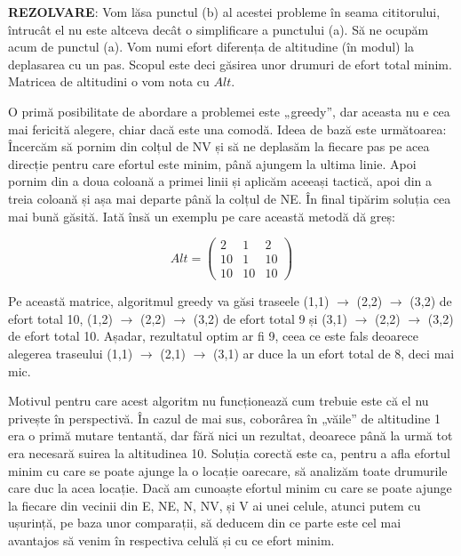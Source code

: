 {\bf REZOLVARE}: Vom lăsa punctul (b) al acestei probleme în seama
cititorului, întrucât el nu este altceva decât o simplificare a punctului
(a). Să ne ocupăm acum de punctul (a). Vom numi efort diferența de altitudine
(în modul) la deplasarea cu un pas. Scopul este deci găsirea unor drumuri de
efort total minim. Matricea de altitudini o vom nota cu $Alt$.

O primă posibilitate de abordare a problemei este „greedy”, dar aceasta nu e
cea mai fericită alegere, chiar dacă este una comodă. Ideea de bază este
următoarea: Încercăm să pornim din colțul de NV și să ne deplasăm la fiecare
pas pe acea direcție pentru care efortul este minim, până ajungem la ultima
linie. Apoi pornim din a doua coloană a primei linii și aplicăm aceeași
tactică, apoi din a treia coloană și așa mai departe până la colțul de NE. În
final tipărim soluția cea mai bună găsită. Iată însă un exemplu pe care
această metodă dă greș:

\begin{equation}
  Alt =
  \begin{pmatrix}
    2 & 1 & 2 \\
    10 & 1 & 10 \\
    10 & 10 & 10
  \end{pmatrix}
\end{equation}

Pe această matrice, algoritmul greedy va găsi traseele (1,1) $\to$ (2,2) $\to$
(3,2) de efort total 10, (1,2) $\to$ (2,2) $\to$ (3,2) de efort total 9 și
(3,1) $\to$ (2,2) $\to$ (3,2) de efort total 10. Așadar, rezultatul optim ar
fi 9, ceea ce este fals deoarece alegerea traseului (1,1) $\to$ (2,1) $\to$
(3,1) ar duce la un efort total de 8, deci mai mic.

Motivul pentru care acest algoritm nu funcționează cum trebuie este că el nu
privește în perspectivă. În cazul de mai sus, coborârea în „văile” de
altitudine 1 era o primă mutare tentantă, dar fără nici un rezultat, deoarece
până la urmă tot era necesară suirea la altitudinea 10. Soluția corectă este
ca, pentru a afla efortul minim cu care se poate ajunge la o locație oarecare,
să analizăm toate drumurile care duc la acea locație. Dacă am cunoaște efortul
minim cu care se poate ajunge la fiecare din vecinii din E, NE, N, NV, și V ai
unei celule, atunci putem cu ușurință, pe baza unor comparații, să deducem din
ce parte este cel mai avantajos să venim în respectiva celulă și cu ce efort
minim.

\newcommand\EFF{\mathit{Eff}}

